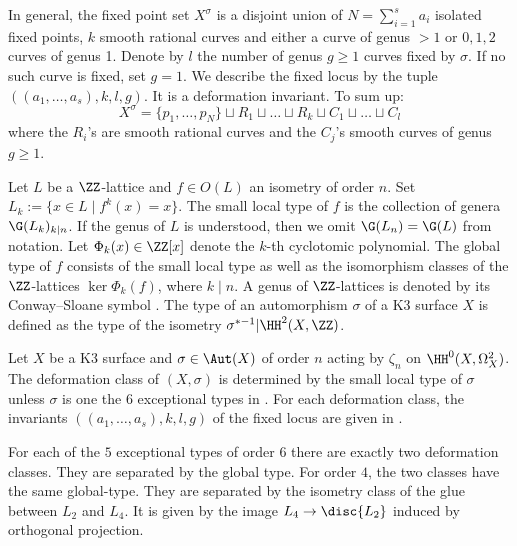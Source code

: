 In general, the fixed point set $X^\sigma$ is a disjoint union of $N = \sum_{i=1}^s a_i$ isolated fixed points, $k$ smooth rational curves and either a curve of genus $>1$
or $0, 1, 2$ curves of genus 1.
Denote by $l$ the number of genus $g \geq 1$ curves fixed by $\sigma$. If no such curve is fixed, set $g=1$. We describe the fixed locus by the tuple
$((a_1, \dots, a_s), k, l, g)$. It is a deformation invariant.
To sum up:
\[X^\sigma = \{p_1, \dots, p_N\} \sqcup R_1 \sqcup \dots \sqcup R_k \sqcup C_1 \sqcup \dots \sqcup C_l\]
where the $R_i$'s are smooth rational curves and the $C_j$'s smooth curves of genus $g \geq 1$.


Let $L$ be a $\ZZ$-lattice and $f\in O(L)$ an isometry of order $n$.
Set $L_k:=\{x \in L \mid f^k(x)=x\}$.
The small local type of $f$ is the collection of genera $\G(L_k)_{k \mid n}$. If the genus of $L$ is understood, then we omit $\G(L_n)=\G(L)$ from notation.
Let $\Phi_k(x)\in \ZZ[x]$ denote the $k$-th cyclotomic polynomial.
The global type of $f$ consists of the small local type as well as the isomorphism classes of the $\ZZ$-lattices $\ker \Phi_k(f)$, where $k \mid n$. A genus of $\ZZ$-lattices is denoted by its Conway--Sloane symbol \cite{splag}. The type of an automorphism $\sigma$ of a K3 surface $X$ is defined as the type of the isometry $\sigma^{*-1}|\HH^2(X,\ZZ)$.

\begin{theorem}
 Let $X$ be a K3 surface and $\sigma \in \Aut(X)$ of order $n$ acting by $\zeta_n$ on $\HH^0(X,\Omega_X^2)$. The deformation class of $(X, \sigma)$ is determined by the small local type of $\sigma$ unless $\sigma$ is one the $6$ exceptional types in .
 For each deformation class, the invariants $((a_1, \dots, a_s), k, l, g)$ of the fixed locus are given in .
\end{theorem}
\begin{remark}
 For each of the $5$ exceptional types of order $6$ there are exactly two deformation classes. They are separated by the global type.
 For order $4$, the two classes have the same global-type. They are separated by the isometry class of the glue between $L_2$ and $L_4$. It is given by the image $L_4 \to \disc{L_2}$ induced by orthogonal projection.
\end{remark}

